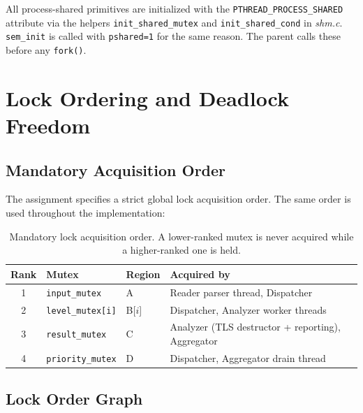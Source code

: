\documentclass[11pt,a4paper]{article}
\newcommand{\code}[1]{\texttt{\small #1}}
\newcommand{\fname}[1]{\textit{\small #1}}
\begin{document}
\begin{infobox}
All process-shared primitives are initialized with the
\code{PTHREAD\_PROCESS\_SHARED} attribute via the helpers
\code{init\_shared\_mutex} and \code{init\_shared\_cond} in
\fname{shm.c}. \code{sem\_init} is called with \code{pshared=1} for the
same reason. The parent calls these before any \code{fork()}.
\end{infobox}

\section{Lock Ordering and Deadlock Freedom}

\subsection{Mandatory Acquisition Order}

The assignment specifies a strict global lock acquisition order. The same
order is used throughout the implementation:

\begin{table}[H]
\centering
\small
\renewcommand{\arraystretch}{1.3}
\begin{tabular}{c l l l}
\toprule
\rowcolor{primary!15}
\textbf{Rank} & \textbf{Mutex} & \textbf{Region} & \textbf{Acquired by} \\
\midrule
1 & \code{input\_mutex}    & A           & Reader parser thread, Dispatcher \\
2 & \code{level\_mutex[i]} & B[$i$]      & Dispatcher, Analyzer worker threads \\
3 & \code{result\_mutex}   & C           & Analyzer (TLS destructor + reporting), Aggregator \\
4 & \code{priority\_mutex} & D           & Dispatcher, Aggregator drain thread \\
\bottomrule
\end{tabular}
\caption{Mandatory lock acquisition order. A lower-ranked mutex is never
acquired while a higher-ranked one is held.}
\end{table}

\subsection{Lock Order Graph}
\end{document}

